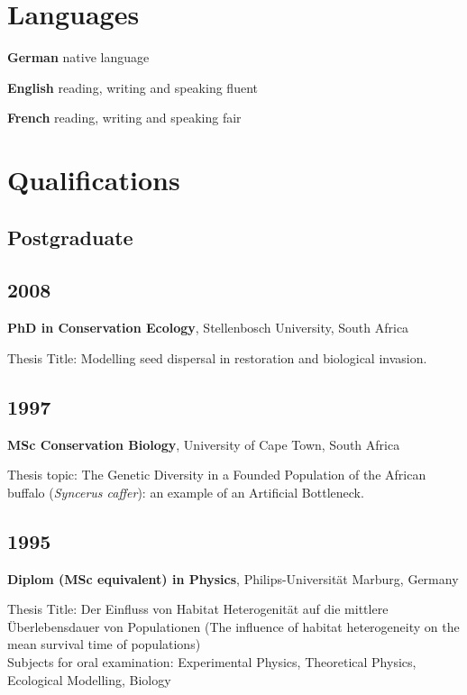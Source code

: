\documentclass[a4paper]{article}
\begin{document}
\section{Languages}

\textbf{German} native language

\textbf{English} reading, writing and speaking fluent

\textbf{French} reading, writing and speaking fair


\section{Qualifications}

\subsection{Postgraduate}


\subsection{2008}

\textbf{PhD in Conservation Ecology}, Stellenbosch University, South Africa

Thesis Title: Modelling seed dispersal in restoration and biological
invasion.

\subsection{1997}

\textbf{MSc Conservation Biology}, University of Cape Town, South Africa

Thesis topic: The Genetic Diversity in a Founded Population of the
African buffalo (\emph{Syncerus caffer}): an example of an Artificial
Bottleneck.

\subsection{1995}

\textbf{Diplom (MSc equivalent) in Physics}, Philips-Universität Marburg, Germany

Thesis Title: Der Einfluss von Habitat Heterogenität auf die mittlere
Überlebensdauer von Populationen (The influence of habitat heterogeneity
on the mean survival time of populations)\\
Subjects for oral examination: Experimental Physics, Theoretical
Physics, Ecological Modelling, Biology
\end{document}
